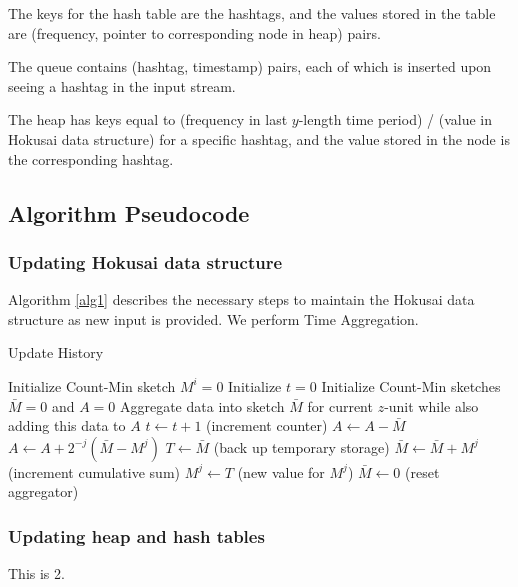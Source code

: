 \documentclass[twoside]{article}
\begin{document}
The keys for the hash table are the hashtags, and the values stored in the table are (frequency, pointer to corresponding node in heap) pairs.

The queue contains (hashtag, timestamp) pairs, each of which is inserted upon seeing a hashtag in the input stream.

The heap has keys equal to (frequency in last $y$-length time period) / (value in Hokusai data structure) for a specific hashtag, and the value stored in the node is the corresponding hashtag.


\subsection{Algorithm Pseudocode} 

\subsubsection{Updating Hokusai data structure}

Algorithm \ref{alg1} describes the necessary steps to maintain the Hokusai data structure as new input is provided. We perform Time Aggregation. 

\begin{algorithm}
\caption{Update History} \label{alg1}
\begin{algorithmic}[1]
	\State Initialize Count-Min sketch $M^i = 0$
\EndFor
\State Initialize $t = 0$
\State Initialize Count-Min sketches $\bar{M} = 0$ and $A = 0$
	\State Aggregate data into sketch $\bar{M}$ for current $z$-unit while also adding this data to $A$
	\State $t \leftarrow t + 1$ (increment counter)
	\State $A \leftarrow A - \bar{M}$
		\State $A \leftarrow A + 2^{-j}(\bar{M} - M^j)$
		\State $T \leftarrow \bar{M}$ (back up temporary storage)
		\State $\bar{M} \leftarrow \bar{M} + M^j$ (increment cumulative sum)
		\State $M^j \leftarrow T$ (new value for $M^j$)
	\EndFor
	\State $\bar{M} \leftarrow 0$ (reset aggregator)
\EndWhile
\end{algorithmic}
\end{algorithm}
 


\subsubsection{Updating heap and hash tables}

This is 2.
\end{document}
